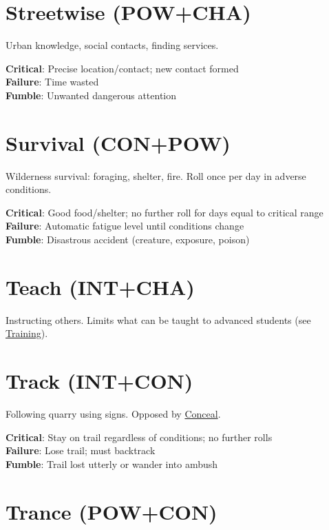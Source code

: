 \documentclass[10pt]{article}
\begin{document}
\section{Streetwise (POW+CHA)}
\label{skill:streetwise}

Urban knowledge, social contacts, finding services.

\textbf{Critical}: Precise location/contact; new contact formed\\
\textbf{Failure}: Time wasted\\
\textbf{Fumble}: Unwanted dangerous attention

\section{Survival (CON+POW)}
\label{skill:survival}

Wilderness survival: foraging, shelter, fire. Roll once per day in adverse conditions.

\textbf{Critical}: Good food/shelter; no further roll for days equal to critical range\\
\textbf{Failure}: Automatic fatigue level until conditions change\\
\textbf{Fumble}: Disastrous accident (creature, exposure, poison)

\section{Teach (INT+CHA)}
\label{skill:teach}

Instructing others. Limits what can be taught to advanced students (see \hyperref[sec:teachers]{Training}).

\section{Track (INT+CON)}
\label{skill:track}

Following quarry using signs. Opposed by \hyperref[skill:conceal]{Conceal}.

\textbf{Critical}: Stay on trail regardless of conditions; no further rolls\\
\textbf{Failure}: Lose trail; must backtrack\\
\textbf{Fumble}: Trail lost utterly or wander into ambush

\section{Trance (POW+CON)}
\label{skill:trance}
\end{document}

